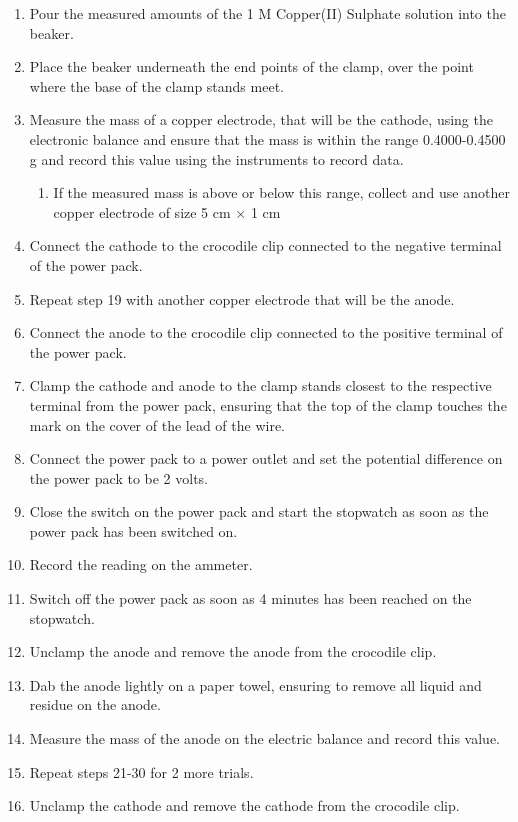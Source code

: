 \documentclass[11pt, a4]{article}
\begin{document}
\begin{enumerate}
				\item Pour the measured amounts of the 1 M Copper(II) Sulphate solution into the beaker.
				\item Place the beaker underneath the end points of the clamp, over the point where the base of the clamp stands meet.
				\item Measure the mass of a copper electrode, that will be the cathode, using the electronic balance and ensure that the mass is within the range 0.4000-0.4500 g and record this value using the instruments to record data.
				\begin{enumerate}
					\item If the measured mass is above or below this range, collect and use another copper electrode of size 5 cm $\times$ 1 cm
				\end{enumerate}
				\item Connect the cathode to the crocodile clip connected to the negative terminal of the power pack.
				\item Repeat step 19 with another copper electrode that will be the anode.
				\item Connect the anode to the crocodile clip connected to the positive terminal of the power pack.
				\item Clamp the cathode and anode to the clamp stands closest to the respective terminal from the power pack, ensuring that the top of the clamp touches the mark on the cover of the lead of the wire.
				\item Connect the power pack to a power outlet and set the potential difference on the power pack to be 2 volts.
				\item Close the switch on the power pack and start the stopwatch as soon as the power pack has been switched on.
				\item Record the reading on the ammeter.
				\item Switch off the power pack as soon as 4 minutes has been reached on the stopwatch.
				\item Unclamp the anode and remove the anode from the crocodile clip.
				\item Dab the anode lightly on a paper towel, ensuring to remove all liquid and residue on the anode.
				\item Measure the mass of the anode on the electric balance and record this value.
				\item Repeat steps 21-30 for 2 more trials.
				\item Unclamp the cathode and remove the cathode from the crocodile clip.

\end{enumerate}
\end{document}
